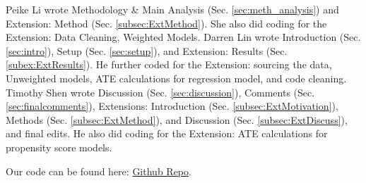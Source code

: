 \documentclass[12pt]{article}
\begin{document}
Peike Li wrote Methodology \& Main Analysis (Sec. \ref{sec:meth_analysis}) and Extension: Method (Sec. \ref{subsec:ExtMethod}). She also did coding for the Extension: Data Cleaning, Weighted Models. Darren Lin wrote Introduction (Sec. \ref{sec:intro}), Setup (Sec. \ref{sec:setup}), and Extension: Results (Sec. \ref{subex:ExtResults}). He further coded for the Extension: sourcing the data, Unweighted models, ATE calculations for regression model, and code cleaning. Timothy Shen wrote Discussion (Sec. \ref{sec:discussion}), Comments (Sec. \ref{sec:finalcomments}), Extensions: Introduction (Sec. \ref{subsec:ExtMotivation}), Methods (Sec. \ref{subsec:ExtMethod}), and Discussion (Sec. \ref{subsec:ExtDiscuss}), and final edits.  He also did coding for the Extension: ATE calculations for propensity score models. 

Our code can be found here: \href{https://github.com/darrenlingit/biostat-m235-final-project}{Github Repo}.



\end{document}
